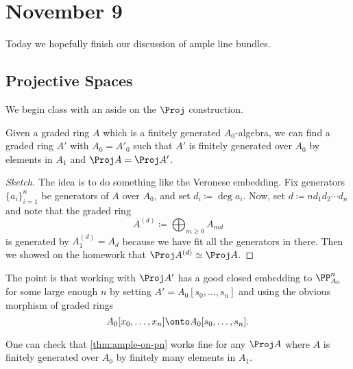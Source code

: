 \documentclass[../notes.tex]{subfiles}
\begin{document}
\section{November 9}

Today we hopefully finish our discussion of ample line bundles.

\subsection{Projective Spaces}
We begin class with an aside on the $\Proj$ construction.
\begin{lemma}
	Given a graded ring $A$ which is a finitely generated $A_0$-algebra, we can find a graded ring $A'$ with $A_0=A'_0$ such that $A'$ is finitely generated over $A_0$ by elements in $A_1$ and $\Proj A=\Proj A'$.
\end{lemma}
\begin{proof}[Sketch]
	The idea is to do something like the Veronese embedding. Fix generators $\{a_i\}_{i=1}^n$ be generators of $A$ over $A_0$, and set $d_i\coloneqq\deg a_i$. Now, set $d\coloneqq nd_1d_2\cdots d_n$ and note that the graded ring
	\[A^{(d)}\coloneqq\bigoplus_{m\ge0}A_{md}\]
	is generated by $A_1^{(d)}=A_d$ because we have fit all the generators in there. Then we showed on the homework that $\Proj A^{(d)}\simeq\Proj A$.
\end{proof}
The point is that working with $\Proj A'$ has a good closed embedding to $\PP^n_{A_0}$ for some large enough $n$ by setting $A'=A_0[s_0,\ldots,s_n]$ and using the obvious morphism of graded rings
\[A_0[x_0,\ldots,x_n]\onto A_0[s_0,\ldots,s_n].\]
\begin{remark}
	One can check that \autoref{thm:ample-on-pn} works fine for any $\Proj A$ where $A$ is finitely generated over $A_0$ by finitely many elements in $A_1$.
\end{remark}
\end{document}
